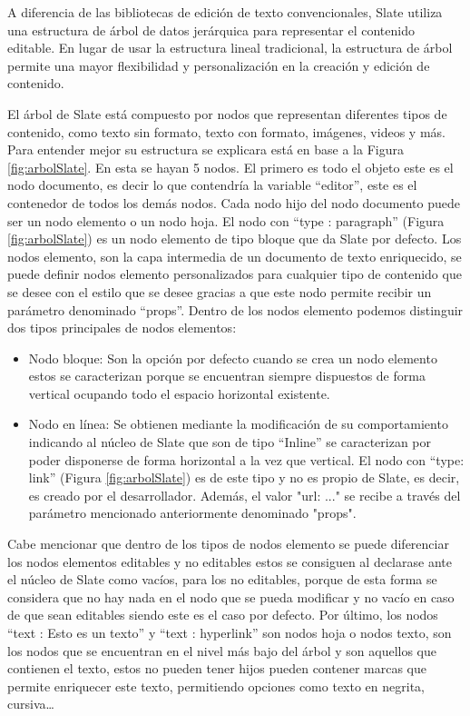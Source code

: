 A diferencia de las bibliotecas de edición de texto convencionales, Slate utiliza una estructura de árbol de datos jerárquica para representar el contenido editable. En lugar de usar la estructura lineal tradicional, la estructura de árbol permite una mayor flexibilidad y personalización en la creación y edición de contenido.

El árbol de Slate está compuesto por nodos que representan diferentes tipos de contenido, como texto sin formato, texto con formato, imágenes, videos y más. Para entender mejor su estructura se explicara está en base a la Figura \ref{fig:arbolSlate}. En esta se hayan 5 nodos. El primero es todo el objeto este es el nodo documento, es decir lo que contendría la variable ``editor'', este es el contenedor de todos los demás nodos. Cada nodo hijo del nodo documento puede ser un nodo elemento o un nodo hoja.  
El nodo con ``type : paragraph'' (Figura \ref{fig:arbolSlate}) es un nodo elemento de tipo bloque que da Slate por defecto. Los nodos elemento, son la capa intermedia de un documento de texto enriquecido, se puede definir nodos elemento personalizados para cualquier tipo de contenido que se desee con el estilo que se desee gracias a que este nodo permite recibir un parámetro denominado ``props''. Dentro de los nodos elemento podemos distinguir dos tipos principales de nodos elementos:

\begin{itemize}
  \item Nodo bloque: Son la opción por defecto cuando se crea un nodo elemento estos se caracterizan porque se encuentran siempre dispuestos de forma vertical ocupando todo el espacio horizontal existente.
  \item Nodo en línea: Se obtienen mediante la modificación de su comportamiento indicando al núcleo de Slate que son de tipo ``Inline'' se caracterizan por poder disponerse de forma horizontal a la vez que vertical.  El nodo con ``type: link'' (Figura \ref{fig:arbolSlate}) es de este tipo y no es propio de Slate, es decir, es creado por el desarrollador. Además, el valor "url: ..." se recibe a través del parámetro mencionado anteriormente denominado "props".
\end{itemize}

Cabe mencionar que dentro de los tipos de nodos elemento se puede diferenciar los nodos elementos editables y no editables estos se consiguen al declarase ante el núcleo de Slate como vacíos, para los no editables, porque de esta forma se considera que no hay nada en el nodo que se pueda modificar y no vacío en caso de que sean editables siendo este es el caso por defecto. 
Por último, los nodos ``text : Esto es un texto'' y ``text : hyperlink'' son nodos hoja o nodos texto, son los nodos que se encuentran en el nivel más bajo del árbol y son aquellos que contienen el texto, estos no pueden tener hijos pueden contener marcas que permite enriquecer este texto, permitiendo opciones como texto en negrita, cursiva…

